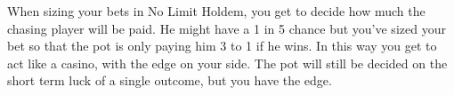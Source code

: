 When sizing your bets in No Limit Holdem, you get to decide how much
the chasing player will be paid. He might have a 1 in 5 chance
but you've sized your bet so that the pot is only paying him 3 to 1 
if he wins. In this way you get to act like a casino, with the edge
on your side. The pot will still be decided on the short term luck
of a single outcome, but you have the edge.

